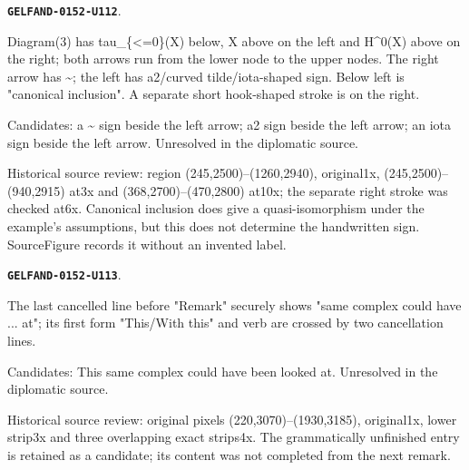 \documentclass[11pt]{article}
\theoremstyle{definition}
\theoremstyle{remark}
\begin{document}
\par\noindent\leavevmode{}\label{GELFAND-0152-U112}\label{GELFAND-P001396:truncation-diagram:note}\textbf{\texttt{GELFAND-0152-U112}}.\nopagebreak[4]\par
Diagram(3) has tau\_\{<=0\}(X) below, X above on the left and H\textasciicircum{}0(X) above on the right; both arrows run from the lower node to the upper nodes. The right arrow has \textasciitilde{}; the left has a2/curved tilde/iota-shaped sign. Below left is "canonical inclusion". A separate short hook-shaped stroke is on the right.\par
Candidates: a \textasciitilde{} sign beside the left arrow; a2 sign beside the left arrow; an iota sign beside the left arrow. Unresolved in the diplomatic source.\par
Historical source review: region (245,2500)–(1260,2940), original1x, (245,2500)–(940,2915) at3x and (368,2700)–(470,2800) at10x; the separate right stroke was checked at6x. Canonical inclusion does give a quasi-isomorphism under the example's assumptions, but this does not determine the handwritten sign. SourceFigure records it without an invented label.\par\medskip
\par\noindent\leavevmode{}\label{GELFAND-0152-U113}\label{GELFAND-P001396:cancelled-bottom-sentence:note}\textbf{\texttt{GELFAND-0152-U113}}.\nopagebreak[4]\par
The last cancelled line before "Remark" securely shows "same complex could have ... at"; its first form "This/With this" and verb are crossed by two cancellation lines.\par
Candidates: This same complex could have been looked at. Unresolved in the diplomatic source.\par
Historical source review: original pixels (220,3070)–(1930,3185), original1x, lower strip3x and three overlapping exact strips4x. The grammatically unfinished entry is retained as a candidate; its content was not completed from the next remark.\par\medskip
\end{document}
